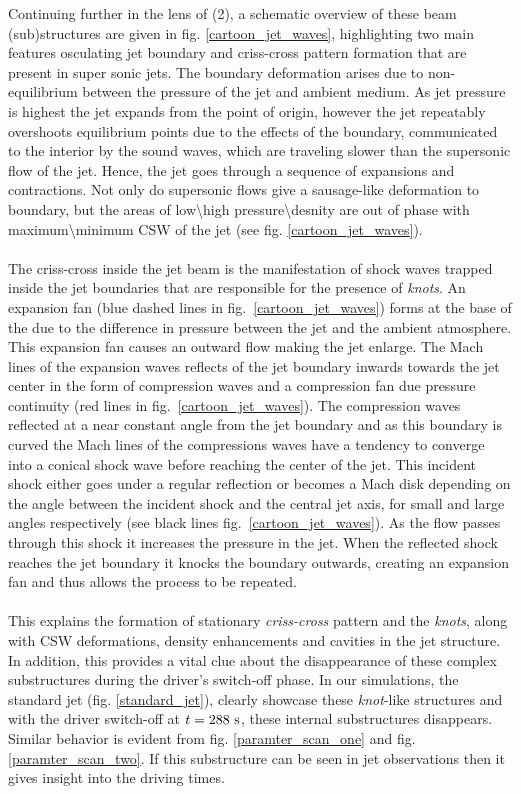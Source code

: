 \documentclass[12pt]{ociamthesis}
\newcommand{\fref}[1]{fig. \ref{#1}}
\newcommand{\np}{\\ \\}
\begin{document}
Continuing further in the lens of (2), a schematic overview of these beam (sub)structures are given in fig. \ref{cartoon_jet_waves}, highlighting two main features osculating jet boundary and criss-cross pattern formation that are present in super sonic jets. The boundary deformation arises due to non-equilibrium between the pressure of the jet and ambient medium. As jet pressure is highest the jet expands from the point of origin, however the jet repeatably overshoots equilibrium points due to the effects of the boundary, communicated to the interior by the sound waves, which are traveling slower than the supersonic flow of the jet. Hence, the jet goes through a sequence of expansions and contractions. Not only do supersonic flows give a sausage-like deformation to boundary, but the areas of low\textbackslash high pressure\textbackslash desnity are out of phase with maximum\textbackslash minimum CSW of the jet (see fig. \ref{cartoon_jet_waves}). \np  
%
The criss-cross inside the jet beam is the manifestation of shock waves trapped inside the jet boundaries that are responsible for the presence of \textit{knots}. An expansion fan (blue dashed lines in fig.~\ref{cartoon_jet_waves}) forms at the base of the due to the difference in pressure between the jet and the ambient atmosphere. This expansion fan causes an outward flow making the jet enlarge. The Mach lines of the expansion waves reflects of the jet boundary inwards towards the jet center in the form of compression waves and a compression fan due pressure continuity (red lines in fig.~\ref{cartoon_jet_waves}). The compression waves reflected at a near constant angle from the jet boundary and as this boundary is curved the Mach lines of the compressions waves have a tendency to converge into a conical shock wave before reaching the center of the jet. This incident shock either goes under a regular reflection or becomes a Mach disk depending on the angle between the incident shock and the central jet axis, for small and large angles respectively (see black lines fig.~\ref{cartoon_jet_waves}). As the flow passes through this shock it increases the pressure in the jet. When the reflected shock reaches the jet boundary it knocks the boundary outwards, creating an expansion fan and thus allows the process to be repeated. \np
%
This explains the formation of stationary \textit{criss-cross} pattern and the \textit{knots}, along with CSW deformations, density enhancements and cavities in the jet structure. In addition, this provides a vital clue about the disappearance of these complex substructures during the driver’s switch-off phase. In our simulations, the standard jet (\fref{standard_jet}), clearly showcase these \textit{knot}-like structures and with the driver switch-off at $t=288~\rm{s}$, these internal substructures disappears. Similar behavior is evident from \fref{paramter_scan_one} and \fref{paramter_scan_two}. If this substructure can be seen in jet observations then it gives insight into the driving times. 
\end{document}
